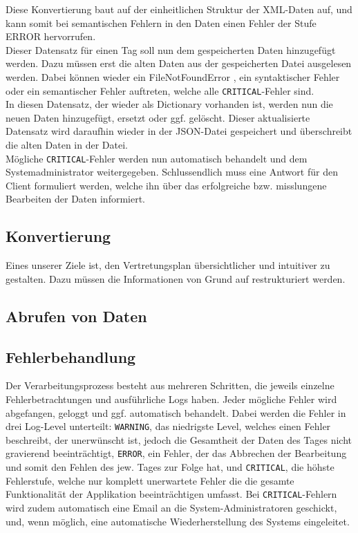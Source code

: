 Diese Konvertierung baut auf der einheitlichen Struktur der XML-Daten auf, und kann somit bei semantischen
Fehlern in den Daten einen Fehler der Stufe ERROR hervorrufen.\\
Dieser Datensatz für einen Tag soll nun dem gespeicherten Daten hinzugefügt werden. Dazu müssen erst
die alten Daten aus der gespeicherten Datei ausgelesen werden. Dabei können wieder ein FileNotFoundError
, ein syntaktischer Fehler oder ein semantischer Fehler auftreten, welche alle \texttt{CRITICAL}-Fehler sind. \\
In diesen Datensatz, der wieder als Dictionary vorhanden ist, werden nun die neuen Daten hinzugefügt, ersetzt
oder ggf. gelöscht. Dieser aktualisierte Datensatz wird daraufhin wieder in der JSON-Datei gespeichert und überschreibt
die alten Daten in der Datei.\\
Mögliche \texttt{CRITICAL}-Fehler werden nun automatisch behandelt und dem Systemadministrator weitergegeben.
Schlussendlich muss eine Antwort für den Client formuliert werden, welche ihn über das erfolgreiche bzw. misslungene
Bearbeiten der Daten informiert.


\subsection{Konvertierung}
Eines unserer Ziele ist, den Vertretungsplan übersichtlicher und intuitiver zu gestalten. Dazu müssen
die Informationen von Grund auf restrukturiert werden. 

\subsection{Abrufen von Daten}

\subsection{Fehlerbehandlung}
Der Verarbeitungsprozess besteht aus mehreren Schritten, die jeweils einzelne Fehlerbetrachtungen
und ausführliche Logs haben. Jeder mögliche Fehler wird abgefangen, geloggt und ggf. automatisch 
behandelt. Dabei werden die Fehler in drei Log-Level unterteilt: \texttt{WARNING}, das niedrigste Level,
welches einen Fehler beschreibt, der unerwünscht ist, jedoch die Gesamtheit der Daten des Tages
nicht gravierend beeinträchtigt, \texttt{ERROR}, ein Fehler, der das Abbrechen der Bearbeitung und somit
den Fehlen des jew. Tages zur Folge hat, und \texttt{CRITICAL}, die höhste Fehlerstufe, welche nur komplett
unerwartete Fehler die die gesamte Funktionalität der Applikation beeinträchtigen umfasst.
Bei \texttt{CRITICAL}-Fehlern wird zudem automatisch eine Email an die System-Administratoren geschickt,
und, wenn möglich, eine automatische Wiederherstellung des Systems eingeleitet.